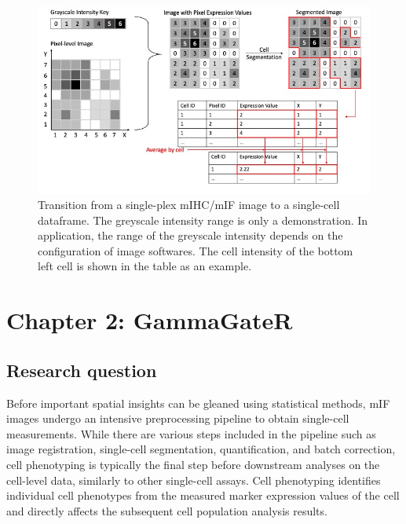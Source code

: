 \documentclass[
  letterpaper,
  DIV=11,
  numbers=noendperiod,
  oneside]{scrreprt}
\begin{document}
\begin{figure}

{\centering \includegraphics{mIFDataStr.jpg}

}

\caption{\label{fig-2}Transition from a single-plex mIHC/mIF image to a
single-cell dataframe. The greyscale intensity range is only a
demonstration. In application, the range of the greyscale intensity
depends on the configuration of image softwares. The cell intensity of
the bottom left cell is shown in the table as an example.}

\end{figure}


\hypertarget{chapter-2-gammagater}{%
\chapter{Chapter 2: GammaGateR}\label{chapter-2-gammagater}}

\hypertarget{research-question}{%
\section{Research question}\label{research-question}}

Before important spatial insights can be gleaned using statistical
methods, mIF images undergo an intensive preprocessing pipeline to
obtain single-cell measurements. While there are various steps included
in the pipeline such as image registration, single-cell segmentation,
quantification, and batch correction, cell phenotyping is typically the
final step before downstream analyses on the cell-level data, similarly
to other single-cell assays. Cell phenotyping identifies individual cell
phenotypes from the measured marker expression values of the cell and
directly affects the subsequent cell population analysis results.
\end{document}
